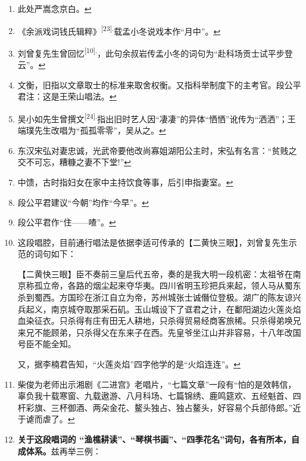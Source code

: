 \begin{enumerate}
\item
  \leavevmode\hypertarget{fn596}{}%
  此处严嵩念京白。\protect\hyperlink{fnref596}{↩}
\item
  \leavevmode\hypertarget{fn597}{}%
  《余派戏词钱氏辑粹》\textsuperscript{{[}23{]}.}载孟小冬说戏本作``月中''。\protect\hyperlink{fnref597}{↩}
\item
  \leavevmode\hypertarget{fn598}{}%
  刘曾复先生曾回忆\textsuperscript{{[}10{]}.}，此句余叔岩传孟小冬的词句为``赴科场贡士试平步登云''。\protect\hyperlink{fnref598}{↩}
\item
  \leavevmode\hypertarget{fn599}{}%
  文衡，旧指以文章取士的标准来取舍权衡。又指科举制度下的主考官。段公平君注：这是王荣山唱法。\protect\hyperlink{fnref599}{↩}
\item
  \leavevmode\hypertarget{fn600}{}%
  吴小如先生曾撰文\textsuperscript{{[}24{]}.}指出旧时艺人因``凄凄''的异体``恓恓''讹传为``洒洒''；王端璞先生改唱为``孤孤零零''，吴从之。\protect\hyperlink{fnref600}{↩}
\item
  \leavevmode\hypertarget{fn601}{}%
  东汉宋弘对妻忠诚，光武帝要他改尚寡姐湖阳公主时，宋弘有名言：``贫贱之交不可忘，糟糠之妻不下堂!''\protect\hyperlink{fnref601}{↩}
\item
  \leavevmode\hypertarget{fn602}{}%
  中馈，古时指妇女在家中主持饮食等事，后引申指妻室。\protect\hyperlink{fnref602}{↩}
\item
  \leavevmode\hypertarget{fn603}{}%
  段公平君建议``今朝''均作``今早''。\protect\hyperlink{fnref603}{↩}
\item
  \leavevmode\hypertarget{fn604}{}%
  段公平君作``住------喳''。\protect\hyperlink{fnref604}{↩}
\item
  \leavevmode\hypertarget{fn605}{}%
  这段唱腔，目前通行唱法是依据李适可传承的【二黄快三眼】，刘曾复先生示范的词句如下：

  【二黄快三眼】臣不奏前三皇后代五帝，奏的是我大明一段机密：太祖爷在南京称孤立帝，各路的烟尘起来夺华夷。四川省明玉珍把兵来起，领人马从蜀东杀到蜀西。方国珍在浙江自立为帝，苏州城张士诚僭位登极。湖广的陈友谅兴兵起义，南京城夺取那采石矶。玉山城设下了诓君之计，在鄱阳湖边火莲炎焰血染征衣。只杀得有庄有田无人耕地，只杀得贸易经商客旅稀。只杀得弟唤兄来兄不能顾弟，只杀得父在东来子在西。先皇爷坐江山并非容易，十八年改国号臣不能全知。

  又，据李楠君告知，``火莲炎焰''四字他学的是``火焰连连''。\protect\hyperlink{fnref605}{↩}
\item
  \leavevmode\hypertarget{fn606}{}%
  柴俊为老师出示湘剧《二进宫》老唱片，``七篇文章''一段有``怕的是效韩信，辜负我十载寒窗、九载遨游、八月科场、七篇锦绣、鹿鸣筵欢、五经魁首、四杆彩旗、三杯御酒、两朵金花、鳌头独占、独占鳌头，好容易个兵部侍郎。''近于谑而虐了。\protect\hyperlink{fnref606}{↩}
\item
  \leavevmode\hypertarget{fn607}{}%
  \textbf{关于这段唱词的
  ``渔樵耕读''、``琴棋书画''、``四季花名''词句，各有所本，自成体系。}兹再举三例：


\end{enumerate}

